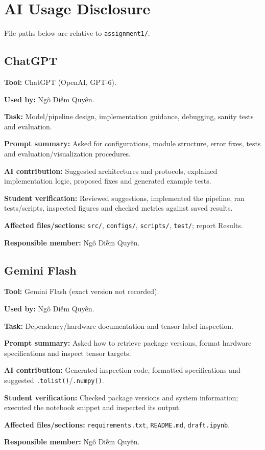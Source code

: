 \clearpage
{}
\section*{AI Usage Disclosure}
\begingroup
\small
\setlength{\parskip}{2pt}
File paths below are relative to \texttt{assignment1/}.

\subsection*{ChatGPT}
\textbf{Tool:} ChatGPT (OpenAI, GPT-6).\par
\textbf{Used by:} Ngô Diễm Quyên.\par
\textbf{Task:} Model/pipeline design, implementation guidance, debugging, sanity tests and evaluation.\par
\textbf{Prompt summary:} Asked for configurations, module structure, error fixes, tests and evaluation/visualization procedures.\par
\textbf{AI contribution:} Suggested architectures and protocols, explained implementation logic, proposed fixes and generated example tests.\par
\textbf{Student verification:} Reviewed suggestions, implemented the pipeline, ran tests/scripts, inspected figures and checked metrics against saved results.\par
\textbf{Affected files/sections:} \texttt{src/}, \texttt{configs/}, \texttt{scripts/}, \texttt{test/}; report Results.\par
\textbf{Responsible member:} Ngô Diễm Quyên.

\subsection*{Gemini Flash}
\textbf{Tool:} Gemini Flash (exact version not recorded).\par
\textbf{Used by:} Ngô Diễm Quyên.\par
\textbf{Task:} Dependency/hardware documentation and tensor-label inspection.\par
\textbf{Prompt summary:} Asked how to retrieve package versions, format hardware specifications and inspect tensor targets.\par
\textbf{AI contribution:} Generated inspection code, formatted specifications and suggested \texttt{.tolist()}/\texttt{.numpy()}.\par
\textbf{Student verification:} Checked package versions and system information; executed the notebook snippet and inspected its output.\par
\textbf{Affected files/sections:} \texttt{requirements.txt}, \texttt{README.md}, \texttt{draft.ipynb}.\par
\textbf{Responsible member:} Ngô Diễm Quyên.

